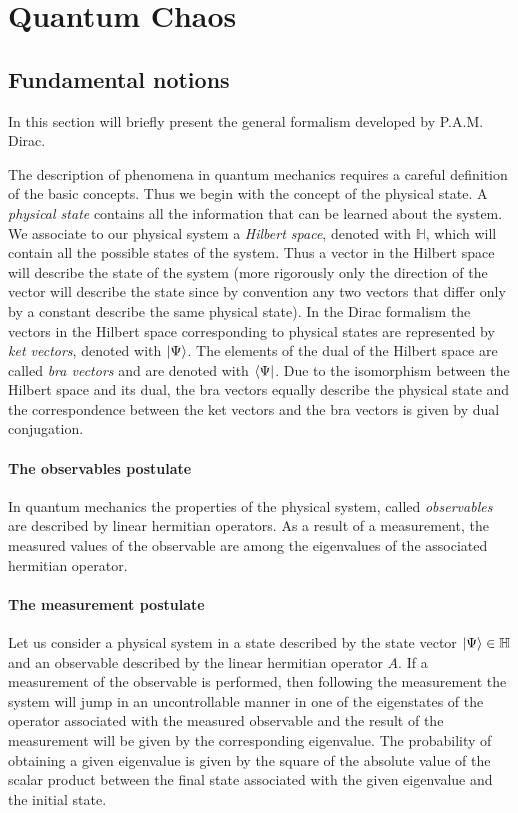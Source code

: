 \documentclass[../thesis.tex]{subfiles}
\theoremstyle{definition}
\begin{document}
\chapter{Quantum Chaos}

\section{Fundamental notions}

In this section will briefly present the general formalism
developed by P.A.M. Dirac.

The description of phenomena in quantum mechanics requires a {\color{red}careful} definition
of the basic concepts. Thus we begin with the concept of the physical state.
A \emph{physical state} contains all the information that can be learned
about the system.
We associate to our physical system a \emph{Hilbert space}, denoted with
\(\mathbb{H}\), which will contain all the possible states of the system.
Thus a vector in the Hilbert space will describe the state of the system
(more rigorously only the direction of the vector will describe the state
since by convention any two vectors that differ only by a constant describe
the same physical state). In the Dirac formalism the vectors in the Hilbert
space corresponding to physical states are represented by \emph{ket vectors},
denoted with \(\ket{\Psi}\). The elements of the dual of the Hilbert space
are called \emph{bra vectors} and are denoted with \(\bra{\Psi}\). Due to the
isomorphism between the Hilbert space and its dual, the bra vectors equally
describe the physical state and the correspondence between the ket vectors and
the bra vectors is given by dual conjugation.

\subsubsection{The observables postulate}

In quantum mechanics the properties of the physical system, called \emph{observables}
are described by linear hermitian operators.
As a result of a measurement, the measured values of the observable are among
the eigenvalues of the associated hermitian operator.

\subsubsection{The measurement postulate}

Let us consider a physical system in a state described by the state vector
\(\ket{\Psi} \in \mathbb{H}\) and an observable described by the linear hermitian
operator \(A\). If a measurement of the observable is performed, then following
the measurement the system will jump in an uncontrollable manner in one of the
eigenstates of the operator associated with the measured observable and the result
of the measurement will be given by the corresponding eigenvalue. The probability
of obtaining a given eigenvalue is given by the square of the absolute value of
the scalar product between the final state associated with the given eigenvalue
and the initial state.
\end{document}

